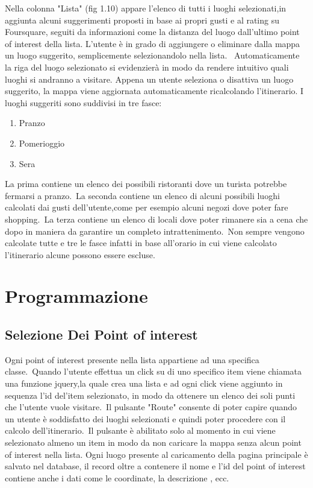 Nella colonna "Lista" (fig 1.10) appare l'elenco di tutti i luoghi selezionati,in aggiunta alcuni suggerimenti proposti in base ai propri gusti e al rating su Foursquare, seguiti da informazioni come la distanza del luogo dall'ultimo point of interest della lista.
L'utente è in grado di aggiungere o eliminare dalla mappa un luogo suggerito, semplicemente selezionandolo nella lista. \
Automaticamente la riga del luogo selezionato si evidenzierà in modo da rendere intuitivo quali luoghi si andranno a visitare.
Appena un utente seleziona o disattiva un luogo suggerito, la mappa viene aggiornata automaticamente ricalcolando l'itinerario.
I luoghi suggeriti sono suddivisi in tre fasce:
\begin{enumerate}
\item Pranzo
\item Pomerioggio
\item Sera
\end{enumerate}

La prima contiene un elenco dei possibili ristoranti dove un turista potrebbe fermarsi a pranzo.\
La seconda contiene un elenco di alcuni possibili luoghi calcolati dai gusti dell'utente,come per esempio alcuni negozi dove poter fare shopping.\
La terza contiene un elenco di locali dove poter rimanere sia a cena che dopo in maniera da garantire un completo intrattenimento.\
Non sempre vengono calcolate tutte e tre le fasce infatti in base all'orario in cui viene calcolato l'itinerario alcune possono essere escluse.


\chapter{Programmazione}
\section{Selezione Dei Point of interest}
Ogni point of interest presente nella lista appartiene ad una specifica classe.\
Quando l'utente effettua un click su di uno specifico item viene chiamata una funzione jquery,la quale crea una lista e ad ogni click viene aggiunto in sequenza l'id del'item selezionato, in modo da ottenere un elenco dei soli punti che l'utente vuole visitare.\
Il pulsante "Route" consente di poter capire quando un utente è soddisfatto dei luoghi selezionati e quindi poter procedere con il calcolo dell'itinerario.\
Il pulsante è abilitato solo al momento in cui viene selezionato almeno un item in modo da non caricare la mappa senza alcun point of interest nella lista.
Ogni luogo presente al caricamento della pagina principale è salvato nel database, il record oltre a contenere il nome e l'id del point of interest contiene anche i dati come le coordinate, la descrizione , ecc.

